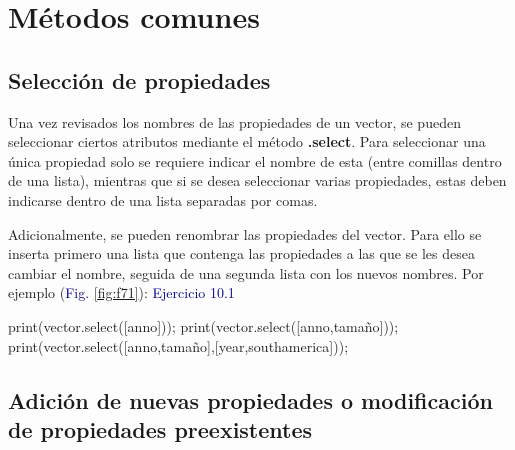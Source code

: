 \documentclass[
  12pt,
  letterpaper,
  twoside]{book}
\newenvironment{Shaded}{\begin{snugshade}}{\end{snugshade}}
\newcommand{\FunctionTok}[1]{\textcolor[rgb]{0.48,0.12,0.64}{#1}}
\newcommand{\NormalTok}[1]{#1}
\newcommand{\OperatorTok}[1]{\textcolor[rgb]{0.00,0.00,0.00}{#1}}
\newcommand{\StringTok}[1]{\textcolor[rgb]{0.87,0.29,0.22}{#1}}
\newcommand\boldpurple[1]{\textcolor{darkpurple}{\textbf{#1}}}
\begin{document}
\hypertarget{muxe9todos-comunes-1}{%
\section{Métodos comunes}\label{muxe9todos-comunes-1}}

\hypertarget{selecciuxf3n-de-propiedades}{%
\subsection*{Selección de propiedades}\label{selecciuxf3n-de-propiedades}}

Una vez revisados los nombres de las propiedades de un vector, se pueden seleccionar ciertos atributos mediante el método \boldpurple{.select}. Para seleccionar una única propiedad solo se requiere indicar el nombre de esta (entre comillas dentro de una lista), mientras que si se desea seleccionar varias propiedades, estas deben indicarse dentro de una lista separadas por comas.

Adicionalmente, se pueden renombrar las propiedades del vector. Para ello se inserta primero una lista que contenga las propiedades a las que se les desea cambiar el nombre, seguida de una segunda lista con los nuevos nombres. Por ejemplo (\textcolor{darkblue}{Fig.} \ref{fig:f71}):
\newpage
\textcolor{darkblue}{Ejercicio 10.1}

\begin{Shaded}
\begin{Highlighting}[]
\FunctionTok{print}\NormalTok{(vector}\OperatorTok{.}\FunctionTok{select}\NormalTok{([}\StringTok{\textquotesingle{}anno\textquotesingle{}}\NormalTok{]))}\OperatorTok{;}
\FunctionTok{print}\NormalTok{(vector}\OperatorTok{.}\FunctionTok{select}\NormalTok{([}\StringTok{\textquotesingle{}anno\textquotesingle{}}\OperatorTok{,}\StringTok{\textquotesingle{}tamaño\textquotesingle{}}\NormalTok{]))}\OperatorTok{;}
\FunctionTok{print}\NormalTok{(vector}\OperatorTok{.}\FunctionTok{select}\NormalTok{([}\StringTok{\textquotesingle{}anno\textquotesingle{}}\OperatorTok{,}\StringTok{\textquotesingle{}tamaño\textquotesingle{}}\NormalTok{]}\OperatorTok{,}\NormalTok{[}\StringTok{\textquotesingle{}year\textquotesingle{}}\OperatorTok{,}\StringTok{\textquotesingle{}southamerica\textquotesingle{}}\NormalTok{]))}\OperatorTok{;}
\end{Highlighting}
\end{Shaded}

\hypertarget{adiciuxf3n-de-nuevas-propiedades-o-modificaciuxf3n-de-propiedades-preexistentes}{%
\subsection*{Adición de nuevas propiedades o modificación de propiedades preexistentes}\label{adiciuxf3n-de-nuevas-propiedades-o-modificaciuxf3n-de-propiedades-preexistentes}}
\end{document}
